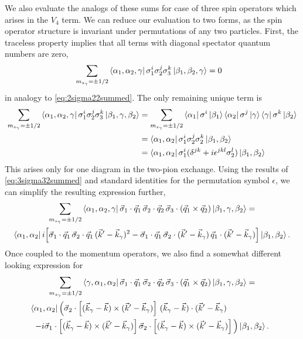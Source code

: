 We also evaluate the analogs of these sums for case of three spin operators which arises in the $V_4$ term. We can reduce our evaluation to two forms, as the spin operator structure is invariant under permutations of any two particles. First, the traceless property implies that all terms with diagonal spectator quantum numbers are zero, 
\begin{align}\label{eq:3sigma33summed}
&\sum_{m_{s_\gamma}=\pm1/2} \bra{\alpha_1,\alpha_2, \gamma } \sigma_1^i\sigma_2^j\sigma_3^k \ket{\beta_1, \beta_2, \gamma} =0
\end{align}
in analogy to \eqref{eq:2sigma22summed}. The only remaining unique term is
\begin{equation}\begin{split}\label{eq:3sigma32summed}
\sum_{m_{s_\gamma}=\pm1/2} \bra{\alpha_1, \alpha_2,  \gamma } \sigma_1^i\sigma_2^j\sigma_3^k \ket{ \beta_1, \gamma, \beta_2 }
&= \sum_{m_{s_\gamma}=\pm1/2} \bra{\alpha_1} \sigma^i \ket{\beta_1}\bra{\alpha_2}\sigma^j\ket{\gamma}\bra{\gamma}\sigma^k\ket{ \beta_2} \\
&=\bra{\alpha_1, \alpha_2} \sigma_1^i \sigma_2^j\sigma_2^k \ket{\beta_1,\beta_2} \\
&=\bra{\alpha_1, \alpha_2} \sigma_1^i(\delta^{jk}+i \epsilon^{jkl}\sigma_2^l) \ket{\beta_1,\beta_2}
\end{split}
\end{equation}
This arises only for one diagram in the two-pion exchange. Using the results of \eqref{eq:3sigma32summed} and standard identities for the permutation symbol $\epsilon$, we can simplify the resulting expression further,
\begin{multline}
\sum_{m_{s_\gamma}=\pm1/2} \bra{\alpha_1, \alpha_2,  \gamma }\vec{\sigma}_1\cdot \vec{q}_1\,\vec{\sigma}_2\cdot \vec{q}_2 \,\vec{\sigma}_3\cdot(\vec{q}_1\times\vec{q}_2) \ket{ \beta_1, \gamma, \beta_2 } = \\
 \bra{\alpha_1, \alpha_2 }i\Big[\vec{\sigma}_1\cdot \vec{q}_1\,\vec{\sigma}_2\cdot \vec{q}_1 \,(\vec{k}'-\vec{k}_\gamma)^2-\vec{\sigma}_1\cdot \vec{q}_1\,\vec{\sigma}_2\cdot (\vec{k}'-\vec{k}_\gamma) \,\vec{q}_1\cdot(\vec{k}'-\vec{k}_\gamma) \Big] \ket{ \beta_1, \beta_2 } .
\end{multline}
Once coupled to the momentum operators, we also find a somewhat different looking expression for
\begin{multline}
\sum_{m_{s_\gamma}=\pm1/2} \bra{\gamma, \alpha_1, \alpha_2 }\vec{\sigma}_1\cdot \vec{q}_1\,\vec{\sigma}_2\cdot \vec{q}_2 \,\vec{\sigma}_3\cdot(\vec{q}_1\times\vec{q}_2) \ket{ \beta_1, \gamma, \beta_2 } = \\
 \bra{\alpha_1, \alpha_2 } \Big(
\vec{\sigma}_2\cdot \left[(\vec{k}_\gamma-\vec{k})\times(\vec{k}'-\vec{k}_\gamma)\right] \,(\vec{k}_\gamma-\vec{k})\cdot(\vec{k}'-\vec{k}_\gamma) \hspace{2cm}\\
-i \vec{\sigma}_1\cdot \left[(\vec{k}_\gamma-\vec{k})\times(\vec{k}'-\vec{k}_\gamma)\right] \vec{\sigma}_2\cdot \left[(\vec{k}_\gamma-\vec{k})\times(\vec{k}'-\vec{k}_\gamma)\right]
\Big) \ket{ \beta_1, \beta_2 }.
\end{multline}

